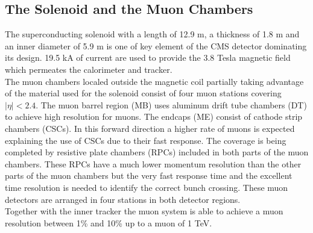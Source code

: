 \subsection{The Solenoid and the Muon Chambers}
\label{sec:muonchambers}
The superconducting solenoid with a length of 12.9 m, a thickness of 1.8 m and an inner diameter of 5.9 m is one of key element of the CMS detector dominating its design. 19.5 kA of current are used to provide the 3.8 Tesla magnetic field which permeates the calorimeter and tracker.\\
The muon chambers\cite{Chatrchyan:2008zzk}\cite{bib:cmsptdr1}\cite{bib:cmstdr:muon} localed outside the magnetic coil partially taking advantage of the material used for the solenoid consist of four muon stations covering $|\eta|<2.4$.
The muon barrel region (MB) uses aluminum drift tube chambers (DT) to achieve high resolution for muons. The endcaps (ME) consist of cathode strip chambers (CSCs). In this forward direction a higher rate of muons is expected explaining the use of CSCs due to their fast response. The coverage is being completed by resistive plate chambers (RPCs) included in both parts of the muon chambers. These RPCs have a much lower momentum resolution than the other parts of the muon chambers but the very fast response time and the excellent time resolution is needed to identify the correct bunch crossing. These muon detectors are arranged in four stations in both detector regions.\\
Together with the inner tracker the muon system is able to achieve a muon \pt resolution between 1\% and 10\% up to a muon \pt of 1 TeV.




